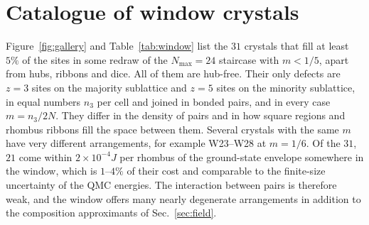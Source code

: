 \documentclass[aps,prb,twocolumn,superscriptaddress,floatfix]{revtex4-2}
\begin{document}
\section{Catalogue of window crystals}\label{app:window}
Figure~\ref{fig:gallery} and Table~\ref{tab:window} list the $31$ crystals that fill at least $5\%$ of the sites in some redraw of the $N_{\max}=24$ staircase with $m<1/5$, apart from hubs, ribbons and dice. All of them are hub-free. Their only defects are $z=3$ sites on the majority sublattice and $z=5$ sites on the minority sublattice, in equal numbers $n_3$ per cell and joined in bonded pairs, and in every case $m=n_3/2N$. They differ in the density of pairs and in how square regions and rhombus ribbons fill the space between them. Several crystals with the same $m$ have very different arrangements, for example W23--W28 at $m=1/6$. Of the $31$, $21$ come within $2\times10^{-4}J$ per rhombus of the ground-state envelope somewhere in the window, which is $1$--$4\%$ of their cost and comparable to the finite-size uncertainty of the QMC energies. The interaction between pairs is therefore weak, and the window offers many nearly degenerate arrangements in addition to the composition approximants of Sec.~\ref{sec:field}.
\end{document}
